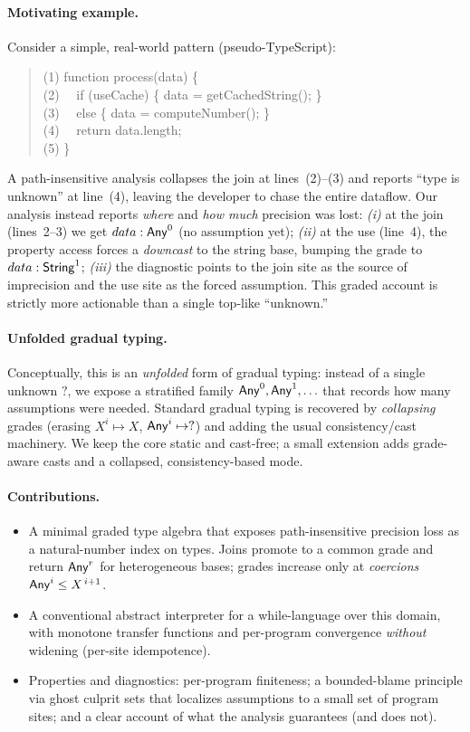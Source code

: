 \paragraph{Motivating example.}
Consider a simple, real-world pattern (pseudo-TypeScript):
\begin{quote}\ttfamily
(1) function process(data) \{\\
(2) \ \ if (useCache) \{ data = getCachedString(); \}\\
(3) \ \ else \{ data = computeNumber(); \}\\
(4) \ \ return data.length;\\
(5) \}
\end{quote}
A path-insensitive analysis collapses the join at lines~(2)--(3) and reports ``type is unknown'' at line~(4), leaving the developer to chase the entire dataflow.
Our analysis instead reports \emph{where} and \emph{how much} precision was lost:
\emph{(i)} at the join (lines~2–3) we get $data:\mathsf{Any}^{0}$ (no assumption yet); 
\emph{(ii)} at the use (line~4), the property access forces a \emph{downcast} to the string base, bumping the grade to $data:\mathsf{String}^{1}$; 
\emph{(iii)} the diagnostic points to the join site as the source of imprecision and the use site as the forced assumption.
This graded account is strictly more actionable than a single top-like ``unknown.''

\paragraph{Unfolded gradual typing.}
Conceptually, this is an \emph{unfolded} form of gradual typing: instead of a single unknown \(?\), we expose a stratified family \(\mathsf{Any}^{0},\mathsf{Any}^{1},\ldots\) that records how many assumptions were needed.
Standard gradual typing is recovered by \emph{collapsing} grades (erasing \(X^{i}\mapsto X\), \(\mathsf{Any}^{i}\mapsto ?\)) and adding the usual consistency/cast machinery.
We keep the core static and cast-free; a small extension adds grade-aware casts and a collapsed, consistency-based mode.

\paragraph{Contributions.}
\begin{itemize}
  \item A minimal graded type algebra that exposes path-insensitive precision loss as a natural-number index on types. Joins promote to a common grade and return \(\mathsf{Any}^{r}\) for heterogeneous bases; grades increase only at \emph{coercions} \(\mathsf{Any}^{i}\le X^{\,i+1}\).
  \item A conventional abstract interpreter for a while-language over this domain, with monotone transfer functions and per-program convergence \emph{without} widening (per-site idempotence).
  \item Properties and diagnostics: per-program finiteness; a bounded-blame principle via ghost culprit sets that localizes assumptions to a small set of program sites; and a clear account of what the analysis guarantees (and does not).
\end{itemize}

